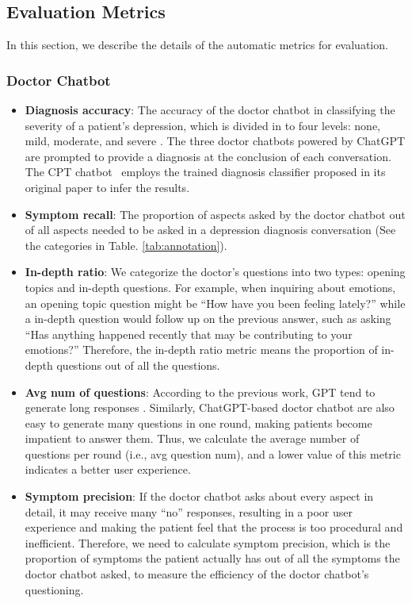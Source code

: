 \subsection{Evaluation Metrics}
\label{apd:eval}
In this section, we describe the details of the automatic metrics for evaluation.
\subsubsection{Doctor Chatbot}
\begin{itemize}
    \item \textbf{Diagnosis accuracy}: The accuracy of the doctor chatbot in classifying the severity of a patient's depression, which is divided in to four levels: none, mild, moderate, and severe \cite{beck1996beck}. The three doctor chatbots powered by ChatGPT are prompted to provide a diagnosis at the conclusion of each conversation. The CPT chatbot~\cite{yao-etal-2022-d4} employs the trained diagnosis classifier proposed in its original paper to infer the results.
    \item \textbf{Symptom recall}: The proportion of aspects asked by the doctor chatbot out of all aspects needed to be asked in a depression diagnosis conversation (See the categories in Table. \ref{tab:annotation}).
\end{itemize}

\begin{itemize}
    \item \textbf{In-depth ratio}: We categorize the doctor's questions into two types: opening topics and in-depth questions. For example, when inquiring about emotions, an opening topic question might be ``How have you been feeling lately?'' while a in-depth question would follow up on the previous answer, such as asking ``Has anything happened recently that may be contributing to your emotions?'' Therefore, the in-depth ratio metric means the proportion of in-depth questions out of all the questions.
    \item \textbf{Avg num of questions}: According to the previous work, GPT tend to generate long responses \cite{wei2023leveraging}. Similarly, ChatGPT-based doctor chatbot are also easy to generate many questions in one round, making patients become impatient to answer them. Thus, we calculate the average number of questions per round (i.e., avg question num), and a lower value of this metric indicates a better user experience.
    \item \textbf{Symptom precision}: If the doctor chatbot asks about every aspect in detail, it may receive many ``no'' responses, resulting in a poor user experience and making the patient feel that the process is too procedural and inefficient. Therefore, we need to calculate symptom precision, which is the proportion of symptoms the patient actually has out of all the symptoms the doctor chatbot asked, to measure the efficiency of the doctor chatbot's questioning.
\end{itemize}

